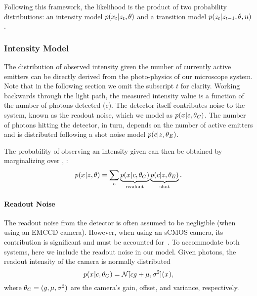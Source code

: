   Following this framework, the likelihood is the product of two probability
  distributions: an intensity model $p(x_{t}|z_{t},\theta)$ and a
  transition model $p(z_{t}|z_{t-1},\theta,n)$.

\subsubsection{Intensity Model}

The distribution of observed intensity  given the number of
currently active emitters  can be directly derived from the photo-physics
of our microscope system.
  Note that in the following section we omit the subscript $t$ for clarity.
  Working backwards through the light path, the measured intensity value \x{}
  is a function of the number of photons \photons detected
  (c).
  The detector itself contributes noise to the system, known as the readout
  noise, which we model as $p(x_{}|c,\theta_C)$.
  The number of photons hitting the detector, in turn, depends on the number of
  active emitters \z{} and is distributed following a shot noise model
  $p(c|z_{},\theta_E)$.

The probability of observing an intensity \x{} given \z{} can then be obtained
by marginalizing over \photons, \ie:
  \begin{equation}
    p(x_{}|z_{},\theta) =
      \sum_c
        \underbrace{p(x_{}|c,\theta_C)}_{\text{readout}}
        \underbrace{p(c|z_{},\theta_E)}_{\text{shot}}
    \text{.}
    \label{eq:method:marginalized_intensity}
  \end{equation}

\paragraph{Readout Noise}

The readout noise from the detector is often assumed to be negligible (\ie when
using an EMCCD camera).
  However, when using an sCMOS camera, its contribution is significant and 
  must be accounted for~\citep{huang_video-rate_2013}.
  To accommodate both systems, here we include the readout noise in our model.
  Given \photons photons, the readout intensity of the camera is normally
  distributed~\citep{huang_video-rate_2013}
  \begin{equation}
    p(x_{}|c,\theta_C) = \mathcal{N}[cg + \mu, \sigma^2](x_{})
    \text{,}
  \end{equation}
  where $\theta_C = (g, \mu, \sigma^2)$ are the camera's gain,
  offset, and variance, respectively.

